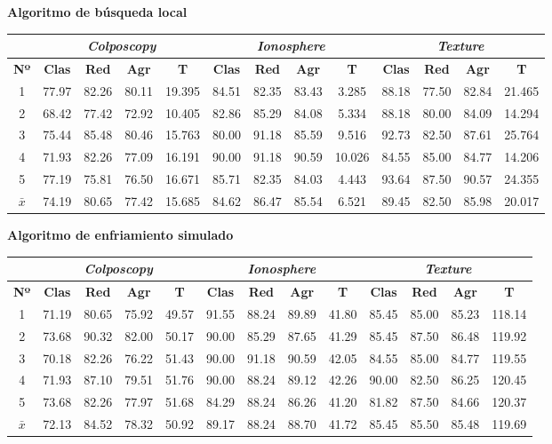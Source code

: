 \documentclass[12pt]{article}
\begin{document}
{\color{red}\textbf{Algoritmo de búsqueda local}}

\begin{table}[ht!]
\begin{tabular}{ccccc|cccc|cccc}
\centering
 & \multicolumn{4}{c}{\textit{Colposcopy}} & \multicolumn{4}{c}{\textit{Ionosphere}} & \multicolumn{4}{c}{\textit{Texture}} \\ \hline
\textbf{Nº} & \textbf{Clas} & \textbf{Red} & \textbf{Agr} & \textbf{T} & \textbf{Clas} & \textbf{Red} & \textbf{Agr} & \textbf{T} & \textbf{Clas} & \textbf{Red} & \textbf{Agr} & \textbf{T} \\ \hline
1 & 77.97 & 82.26 & 80.11 & 19.395 & 84.51 & 82.35 & 83.43 & 3.285 & 88.18 & 77.50 & 82.84 & 21.465\\
2 & 68.42 & 77.42 & 72.92 & 10.405 & 82.86 & 85.29 & 84.08 & 5.334 & 88.18 & 80.00 & 84.09 & 14.294\\
3 & 75.44 & 85.48 & 80.46 & 15.763 & 80.00 & 91.18 & 85.59 & 9.516 & 92.73 & 82.50 & 87.61 & 25.764\\
4 & 71.93 & 82.26 & 77.09 & 16.191 & 90.00 & 91.18 & 90.59 & 10.026 & 84.55 & 85.00 & 84.77 & 14.206\\
5 & 77.19 & 75.81 & 76.50 & 16.671 & 85.71 & 82.35 & 84.03 & 4.443 & 93.64 & 87.50 & 90.57 & 24.355\\
\hline
$\bar{x}$  & 74.19 & 80.65 & 77.42 & 15.685 & 84.62 & 86.47 & 85.54 & 6.521 & 89.45 & 82.50 & 85.98 & 20.017
\end{tabular}
\end{table}

\textbf{Algoritmo de enfriamiento simulado}

\begin{table}[ht!]
\begin{tabular}{ccccc|cccc|cccc}
\centering
 & \multicolumn{4}{c}{\textit{Colposcopy}} & \multicolumn{4}{c}{\textit{Ionosphere}} & \multicolumn{4}{c}{\textit{Texture}} \\ \hline
\textbf{Nº} & \textbf{Clas} & \textbf{Red} & \textbf{Agr} & \textbf{T} & \textbf{Clas} & \textbf{Red} & \textbf{Agr} & \textbf{T} & \textbf{Clas} & \textbf{Red} & \textbf{Agr} & \textbf{T} \\ \hline
1 & 71.19 & 80.65 & 75.92 & 49.57 & 91.55 & 88.24 & 89.89 & 41.80 & 85.45 & 85.00 & 85.23 & 118.14\\
2 & 73.68 & 90.32 & 82.00 & 50.17 & 90.00 & 85.29 & 87.65 & 41.29 & 85.45 & 87.50 & 86.48 & 119.92\\
3 & 70.18 & 82.26 & 76.22 & 51.43 & 90.00 & 91.18 & 90.59 & 42.05 & 84.55 & 85.00 & 84.77 & 119.55\\
4 & 71.93 & 87.10 & 79.51 & 51.76 & 90.00 & 88.24 & 89.12 & 42.26 & 90.00 & 82.50 & 86.25 & 120.45\\
5 & 73.68 & 82.26 & 77.97 & 51.68 & 84.29 & 88.24 & 86.26 & 41.20 & 81.82 & 87.50 & 84.66 & 120.37\\
\hline
$\bar{x}$ & 72.13 & 84.52 & 78.32 & 50.92 & 89.17 & 88.24 & 88.70 & 41.72 & 85.45 & 85.50 & 85.48 & 119.69
\end{tabular}
\end{table}
\end{document}

